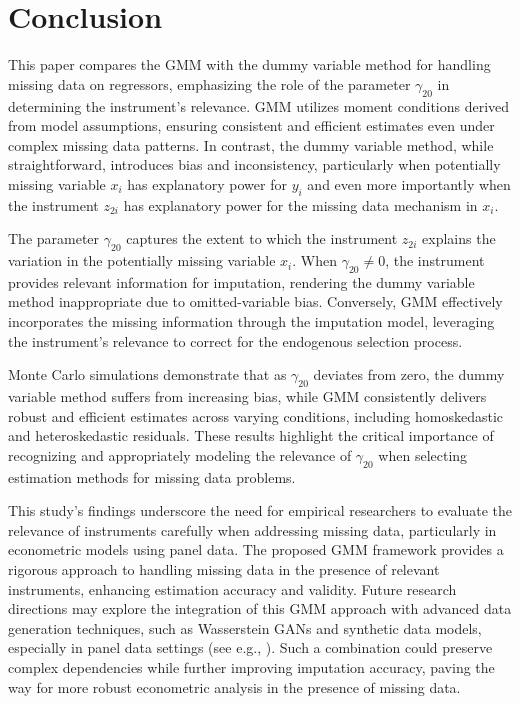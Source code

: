 \section{Conclusion}
This paper compares the GMM with the dummy variable method for handling missing data on regressors, emphasizing the role of the parameter $\gamma_{20}$ in determining the instrument's relevance.
GMM utilizes moment conditions derived from model assumptions, ensuring consistent and efficient estimates even under complex missing data patterns.
In contrast, the dummy variable method, while straightforward, introduces bias and inconsistency, particularly when potentially missing variable $x_i$ has explanatory power for $y_i$ and even more importantly when the instrument $z_{2i}$ has explanatory power for the missing data mechanism in $x_i$.

The parameter $\gamma_{20}$ captures the extent to which the instrument $z_{2i}$ explains the variation in the potentially missing variable $x_i$.
When $\gamma_{20} \neq 0$, the instrument provides relevant information for imputation, rendering the dummy variable method inappropriate due to omitted-variable bias.
Conversely, GMM effectively incorporates the missing information through the imputation model, leveraging the instrument's relevance to correct for the endogenous selection process.

Monte Carlo simulations demonstrate that as $\gamma_{20}$ deviates from zero, the dummy variable method suffers from increasing bias, while GMM consistently delivers robust and efficient estimates across varying conditions, including homoskedastic and heteroskedastic residuals.
These results highlight the critical importance of recognizing and appropriately modeling the relevance of $\gamma_{20}$ when selecting estimation methods for missing data problems.

This study's findings underscore the need for empirical researchers to evaluate the relevance of instruments carefully when addressing missing data, particularly in econometric models using panel data.
The proposed GMM framework provides a rigorous approach to handling missing data in the presence of relevant instruments, enhancing estimation accuracy and validity.
Future research directions may explore the integration of this GMM approach with advanced data generation techniques, such as Wasserstein GANs and synthetic data models, especially in panel data settings (see e.g., \citet{athey2019, stanley2024}).
Such a combination could preserve complex dependencies while further improving imputation accuracy, paving the way for more robust econometric analysis in the presence of missing data.
